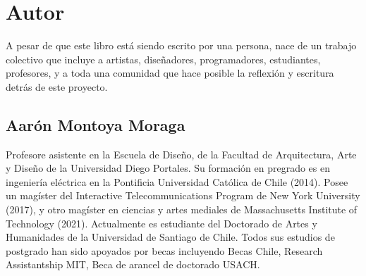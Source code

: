 \documentclass[../principal.tex]{subfiles}
\begin{document}
\chapter{Autor}

A pesar de que este libro está siendo escrito por una persona, nace de un trabajo colectivo que incluye a artistas, diseñadores, programadores, estudiantes, profesores, y a toda una comunidad que hace posible la reflexión y escritura detrás de este proyecto.

\section{Aarón Montoya Moraga}

Profesore asistente en la Escuela de Diseño, de la Facultad de Arquitectura, Arte y Diseño de la Universidad Diego Portales. Su formación en pregrado es en ingeniería eléctrica en la Pontificia Universidad Católica de Chile (2014). Posee un magíster del Interactive Telecommunications Program de New York University (2017), y otro magíster en ciencias y artes mediales de Massachusetts Institute of Technology (2021). Actualmente es estudiante del Doctorado de Artes y Humanidades de la Universidad de Santiago de Chile. Todos sus estudios de postgrado han sido apoyados por becas incluyendo Becas Chile, Research Assistantship MIT, Beca de arancel de doctorado USACH.

\newpage
\end{document}
